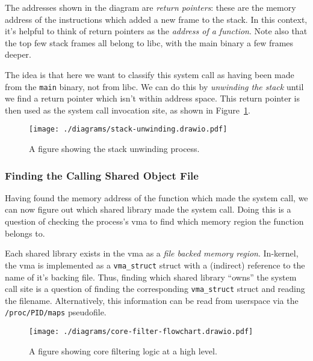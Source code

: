 The addresses shown in the diagram are \textit{return pointers}: these are the
memory address of the instructions which added a new frame to the stack. In this
context, it's helpful to think of return pointers as the \textit{address of a
function}. Note also that the top few stack frames all belong to \ac{libc}, with
the main binary a few frames deeper.

The idea is that here we want to classify this system call as having been made from
the \texttt{main} binary, not from \ac{libc}. We can do this by
\textit{unwinding the stack} until we find a return pointer which isn't within
 address space. This return pointer is then used as the system call
invocation site, as shown in Figure~\ref{fig:stack-unwinding}.

\begin{figure}[ht]
    \centering
    \texttt{[image: ./diagrams/stack-unwinding.drawio.pdf]} 
    \caption{A figure showing the stack unwinding process.}
    \label{fig:stack-unwinding}
\end{figure}

\subsubsection{Finding the Calling Shared Object File}\label{subsubsec:find_so}

Having found the memory address of the function which made the system call, we
can now figure out which shared library made the system call. Doing this is a
question of checking the process's \ac{vma} to find which memory region the
function belongs to. 

Each shared library exists in the \ac{vma} as a \textit{file backed memory region}.
In-kernel, the \ac{vma} is implemented as a \texttt{vma\_struct} struct with a
(indirect) reference to the name of it's backing file. Thus, finding which
shared library ``owns'' the system call site is a question of finding the
corresponding \texttt{vma\_struct} struct and reading the filename.
Alternatively, this information can be read from userspace via the
\texttt{/proc/PID/maps} pseudofile.

\begin{figure}[h]
    \centering
    \texttt{[image: ./diagrams/core-filter-flowchart.drawio.pdf]}
    \caption{A figure showing \afg core filtering logic at a high level.}
    \label{fig:core-filter-flowchart}
\end{figure}

